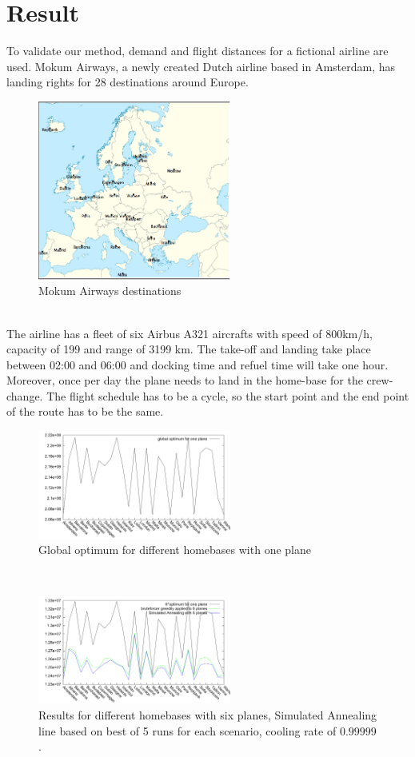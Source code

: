 \documentclass[journal]{IEEEtran}
\begin{document}
\section{Result}
To validate our method, demand and flight distances for a fictional airline are used. Mokum Airways, a newly created Dutch airline based in Amsterdam, has landing rights for 28 destinations around Europe.\\
\begin{figure}[!h]
\centering
\includegraphics[width=2.5in]{europe}
\caption{Mokum Airways destinations}
\label{fig:europe}
\end{figure}
\\
The airline has a fleet of six Airbus A321 aircrafts with speed of 800km/h, capacity of 199 and range of 3199 km.  The take-off and landing take place between 02:00 and 06:00 and docking time and refuel time will take one hour. Moreover, once per day the plane needs to land in the home-base for the crew-change. The flight schedule has to be a cycle, so the start point and the end point of the route has to be the same. \\
\begin{figure}[!h]
\centering
\includegraphics[width=2.5in]{different_homebases_one_plane}
\caption{Global optimum for different homebases with one plane}
\label{fig:different_homebase_one_plane}
\end{figure}
\\
\begin{figure}[!h]
\centering
\includegraphics[width=2.5in]{different_homebases}
\caption{Results for different homebases with six planes, Simulated Annealing line based on best of 5 runs for each scenario, cooling rate of $0.99999$.}
\label{fig:different_homebase_six_planes}
\end{figure}
\end{document}
